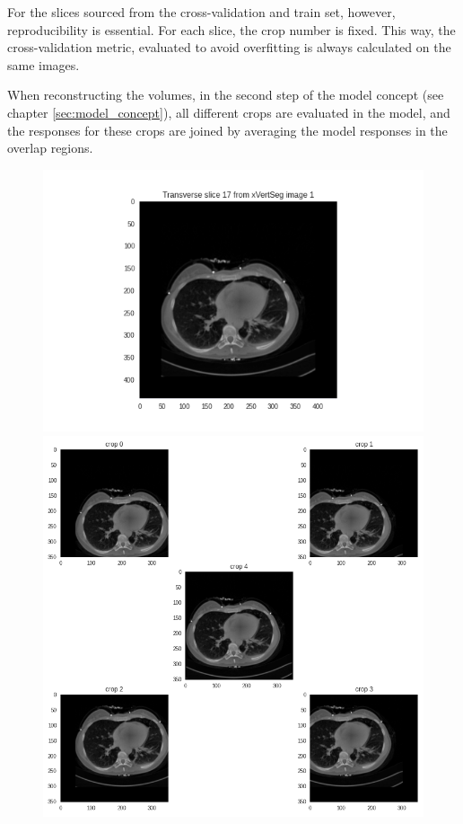 For the slices sourced from the cross-validation and train set, however, reproducibility is essential.
For each slice, the crop number is fixed.
This way, the cross-validation metric, evaluated to avoid overfitting is always calculated on the same images.

When reconstructing the volumes, in the second step of the model concept (see chapter \ref{sec:model_concept}), 
all different crops are evaluated in the model, and the responses for these crops are joined by averaging the model responses in the overlap regions.

\begin{figure}
    \centering
    \begin{minipage}{.99\textwidth}
        \includegraphics[width=.99\textwidth]{images/slice017.png}
    \end{minipage} 
    \begin{minipage}{0.99\textwidth}
        \includegraphics[width=.99\textwidth]{images/cropping_slice017.png}

\end{minipage}
\end{figure}
